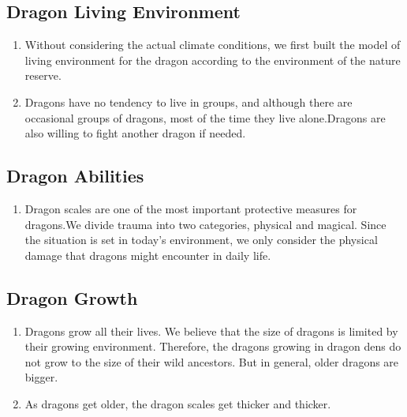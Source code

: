 \subsection{Dragon Living Environment}
\begin{enumerate}[(1)]
    \item Without considering the actual climate conditions, we first built the model of living environment for the dragon according to the environment of the nature reserve.
    \item Dragons have no tendency to live in groups, and although there are occasional groups of dragons, most of the time they live alone.Dragons are also willing to fight another dragon if needed.
\end{enumerate}

\subsection{Dragon Abilities}
\begin{enumerate}[(1)]
    \item Dragon scales are one of the most important protective measures for dragons.We divide trauma into two categories, physical and magical. Since the situation is set in today's environment, we only consider the physical damage that dragons might encounter in daily life.
\end{enumerate}

\subsection{Dragon Growth}
\begin{enumerate}[(1)]
    \item Dragons grow all their lives. We believe that the size of dragons is limited by their growing environment. Therefore, the dragons growing in dragon dens do not grow to the size of their wild ancestors. But in general, older dragons are bigger.
    \item As dragons get older, the dragon scales get thicker and thicker.
\end{enumerate}

